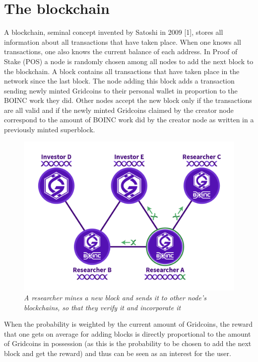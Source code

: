 \section{The blockchain}

A blockchain, seminal concept invented by Satoshi in 2009 [1], stores all information about all transactions that have taken place. When one knows all transactions, one also knows the current balance of each address. In Proof of Stake (POS) a node is randomly chosen among all nodes to add the next block to the blockchain. A block contains all transactions that have taken place in the network since the last block. The node adding this block adds a transaction sending newly minted Gridcoins to their personal wallet in proportion to the BOINC work they did. Other nodes accept the new block only if the transactions are all valid and if the newly minted Gridcoins claimed by the creator node correspond to the amount of BOINC work did by the creator node as written in a previously minted superblock. 

\begin{figure}
\centering
\includegraphics[scale=0.5]{figures/NetworkAndNodes_joshoeah}
\medskip
\caption{\textit{A researcher mines a new block and sends it to other node's blockchains, so that they verify it and incorporate it}}
\small
\end{figure}
 
When the probability is weighted by the current amount of Gridcoins, the reward that one gets on average for adding blocks is directly proportional to the amount of Gridcoins in possession (as this is the probability to be chosen to add the next block and get the reward) and thus can be seen as an interest for the user.
